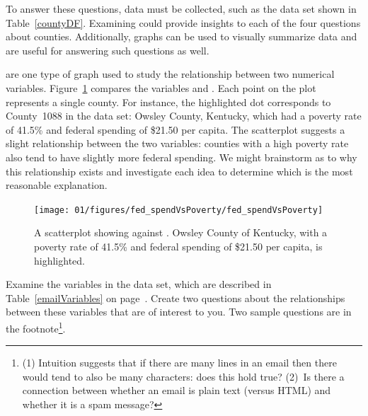 To answer these questions, data must be collected, such as the  data set shown in Table~\ref{countyDF}. Examining  could provide insights to each of the four questions about counties. Additionally, graphs can be used to visually summarize data and are useful for answering such questions as well.



 are one type of graph used to study the relationship between two numerical variables. Figure~\ref{fed_spendVsPoverty} compares the variables  and . Each point on the plot represents a single county. For instance, the highlighted dot corresponds to County~1088 in the  data set: Owsley County, Kentucky, which had a poverty rate of 41.5\% and federal spending of \$21.50 per capita. The scatterplot suggests a slight relationship between the two variables: counties with a high poverty rate also tend to have slightly more federal spending. We might brainstorm as to why this relationship exists and investigate each idea to determine which is the most reasonable explanation.
\begin{figure}
\centering
\texttt{[image: 01/figures/fed\_spendVsPoverty/fed\_spendVsPoverty]}
\caption{A scatterplot showing  against . Owsley County of Kentucky, with a poverty rate of 41.5\% and federal spending of \$21.50 per capita, is highlighted.}
\label{fed_spendVsPoverty}
\end{figure}

\begin{exercise}
Examine the variables in the  data set, which are described in Table~\ref{emailVariables} on page~\pageref{emailVariables}. Create two questions about the relationships between these variables that are of interest to you. Two sample questions are in the footnote\footnote{(1) Intuition suggests that if there are many lines in an email then there would tend to also be many characters: does this hold true? (2)~Is there a connection between whether an email is plain text (versus HTML) and whether it is a spam message?}.
\end{exercise}


